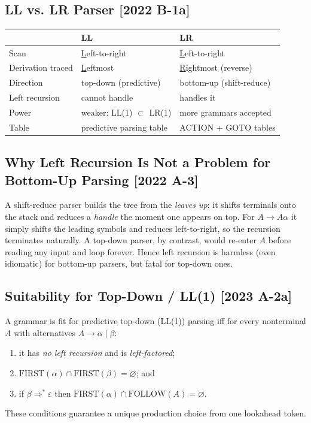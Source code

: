 \documentclass[12pt, a4paper]{article}
\newenvironment{qbox}{\begin{mdframed}[style=qframe]}{\end{mdframed}}
\newcommand{\yr}[1]{{\small\color{accent}\textbf{[#1]}}}
\begin{document}
\subsection{LL vs. LR Parser \yr{2022 B-1a}}
\begin{qbox}
\begin{tabularx}{\linewidth}{@{}l Y Y@{}}
\toprule
 & \textbf{LL} & \textbf{LR}\\
\midrule
Scan & \underline{L}eft-to-right & \underline{L}eft-to-right\\
Derivation traced & \underline{L}eftmost & \underline{R}ightmost (reverse)\\
Direction & top-down (predictive) & bottom-up (shift-reduce)\\
Left recursion & cannot handle & handles it\\
Power & weaker: LL(1) $\subset$ LR(1) & more grammars accepted\\
Table & predictive parsing table & ACTION + GOTO tables\\
\bottomrule
\end{tabularx}
\end{qbox}

\subsection{Why Left Recursion Is Not a Problem for Bottom-Up Parsing \yr{2022 A-3}}
\begin{qbox}
A shift-reduce parser builds the tree from the \emph{leaves up}: it shifts terminals onto the stack and reduces a
\emph{handle} the moment one appears on top. For $A\to A\alpha$ it simply shifts the leading symbols and reduces left-to-right,
so the recursion terminates naturally. A top-down parser, by contrast, would re-enter $A$ before reading any input and
loop forever. Hence left recursion is harmless (even idiomatic) for bottom-up parsers, but fatal for top-down ones.
\end{qbox}

\subsection{Suitability for Top-Down / LL(1) \yr{2023 A-2a}}
\begin{qbox}
A grammar is fit for predictive top-down (LL(1)) parsing iff for every nonterminal $A$ with alternatives
$A\to\alpha\mid\beta$:
\begin{enumerate}
\item it has \emph{no left recursion} and is \emph{left-factored};
\item $\text{FIRST}(\alpha)\cap\text{FIRST}(\beta)=\varnothing$; and
\item if $\beta\Rightarrow^*\varepsilon$ then $\text{FIRST}(\alpha)\cap\text{FOLLOW}(A)=\varnothing$.
\end{enumerate}
These conditions guarantee a unique production choice from one lookahead token.
\end{qbox}
\end{document}

